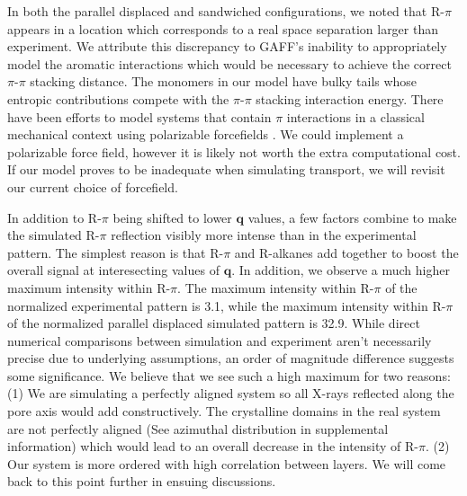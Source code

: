 \documentclass[journal=jpcbfk,manusciprt=article]{achemso}
\begin{document}

  In both the parallel displaced and sandwiched configurations, we noted that
  R-$\pi$ appears in a location which corresponds to a real space separation
  larger than experiment. We attribute this discrepancy to GAFF's inability to
  appropriately model the aromatic interactions which would be necessary to
  achieve the correct $\pi$-$\pi$ stacking distance. 
  The monomers in our model have bulky tails whose entropic contributions compete
  with the $\pi$-$\pi$ stacking interaction energy. There have been efforts to
  model systems that contain $\pi$ interactions in a classical mechanical context
  using polarizable forcefields \cite{baker_polarizable_2015}. We could
  implement a polarizable force field, however it is likely not worth the extra
  computational cost. If our model proves to be inadequate when simulating
  transport, we will revisit our current choice of forcefield.  

  In addition to R-$\pi$ being shifted to lower $\mathbf{q}$ values, a few
  factors combine to make the simulated R-$\pi$ reflection visibly more intense
  than in the experimental pattern. The simplest reason is that R-$\pi$ and
  R-alkanes add together to boost the overall signal at interesecting values of
  $\mathbf{q}$. In addition, we observe a much higher maximum intensity within
  R-$\pi$. The maximum intensity within R-$\pi$ of the normalized experimental
  pattern is 3.1, while the maximum intensity within R-$\pi$ of the normalized
  parallel displaced simulated pattern is 32.9. While direct numerical
  comparisons between simulation and experiment aren't necessarily precise due to
  underlying assumptions, an order of magnitude difference suggests some
  significance. We believe that we see such a high maximum for two reasons: (1)
  We are simulating a perfectly aligned system so all X-rays reflected along the
  pore axis would add constructively. The crystalline domains in the real system
  are not perfectly aligned (See azimuthal distribution in supplemental
  information) which would lead to an overall decrease in the intensity of
  R-$\pi$. (2) Our system is more ordered with high correlation between layers.
  We will come back to this point further in ensuing discussions.
\end{document}
